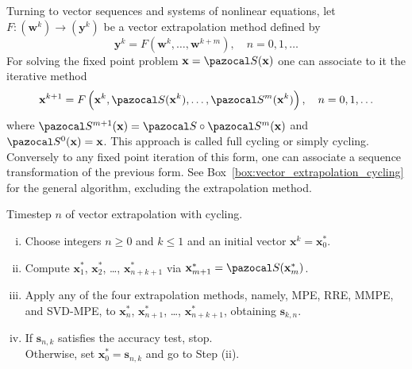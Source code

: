 Turning to vector sequences and systems of nonlinear equations, let \(F:(\mathbf w^{k}) \to(\mathbf y^{k})\) be a vector extrapolation method defined by
\begin{equation}
\mathbf y^k = F\left(\mathbf w^{k}, \ldots, \mathbf w^{k+m}\right), \quad n=0,1, \ldots
\end{equation}
For solving the fixed point problem \(\mathbf x=\pazocal S(\mathbf x)\) one can associate to it the iterative method
\begin{equation}
\mathbf x^{k+1}=F\left(\mathbf x^{k}, \pazocal S(\mathbf x^{k}), \ldots, \pazocal S^{m}(\mathbf x^{k})\right), \quad n=0,1, \ldots
\end{equation}
where \(\pazocal S^{m+1}(\mathbf x)=\pazocal S \circ \pazocal S^{m}(\mathbf x)\) and \(\pazocal S^{0}(\mathbf x)=\mathbf x\).
This approach is called full cycling or simply cycling.
Conversely to any fixed point iteration of this form, one can associate a sequence transformation of the previous form.
See Box~\ref{box:vector_extrapolation_cycling} for the general algorithm, excluding the extrapolation method.

\begin{framedbox}[htbp]
  \caption{Timestep \(n\) of vector extrapolation with cycling.}
  \label{box:vector_extrapolation_cycling}
  \begin{center}
    \begin{minipage}{0.9\textwidth}
    \begin{enumerate}[(i)]
    \item Choose integers \(n\geq 0\) and \(k\leq 1\) and an initial vector \(\mathbf x^k =\mathbf x^*_0\).
    \item Compute \(\mathbf x^*_1\), \(\mathbf x^*_2\), \dots, \(\mathbf x^*_{n+k+1}\) via \(\mathbf x^*_{m+1} = \pazocal S(\mathbf x^*_m)\).
    \item Apply any of the four extrapolation methods, namely, MPE, RRE, MMPE, and SVD-MPE, to \(\mathbf x^*_n\), \(\mathbf x^*_{n+1}\), \dots, \(\mathbf x^*_{n+k+1}\), obtaining \(\mathbf s_{k,n}\).
    \item If \(\mathbf s_{n,k}\) satisfies the accuracy test, stop.\\
    Otherwise, set \(\mathbf x^*_0=\mathbf s_{n,k}\) and go to Step (ii).
    \end{enumerate}
    \end{minipage}
  \end{center}
\end{framedbox}

